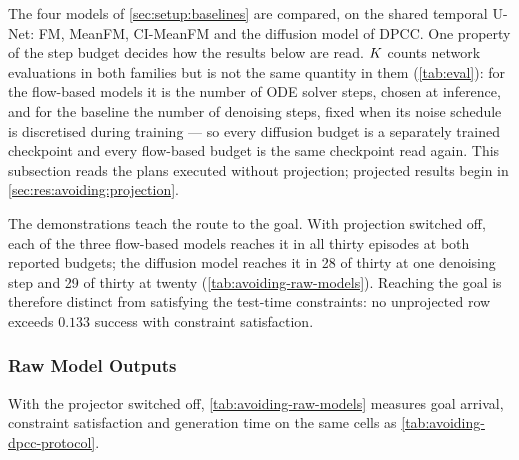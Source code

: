The four models of \autoref{sec:setup:baselines} are compared, on the shared temporal U-Net: FM,
MeanFM, CI-MeanFM and the diffusion model of \ac{DPCC}. One property of the step budget decides how the
results below are read. $K$ counts network evaluations in both families but is not the same quantity
in them (\autoref{tab:eval}): for the flow-based models it is the number of ODE solver steps, chosen at
inference, and for the baseline the number of denoising steps, fixed when its noise schedule is
discretised during training --- so every diffusion budget is a separately trained checkpoint and every
flow-based budget is the same checkpoint read again. This subsection reads the plans executed without
projection; projected results begin in \autoref{sec:res:avoiding:projection}.

The demonstrations teach the route to the goal. With projection switched off, each of the three
flow-based models reaches it in all thirty episodes at both reported budgets; the diffusion model
reaches it in 28 of thirty at one denoising step and 29 of thirty at twenty
(\autoref{tab:avoiding-raw-models}). Reaching the goal is therefore distinct from satisfying the
test-time constraints: no unprojected row exceeds $0.133$ success with constraint satisfaction.

\subsubsection{Raw Model Outputs}\label{sec:res:avoiding:raw}

With the projector switched off, \autoref{tab:avoiding-raw-models} measures goal arrival, constraint satisfaction and generation time on the same cells as \autoref{tab:avoiding-dpcc-protocol}.

